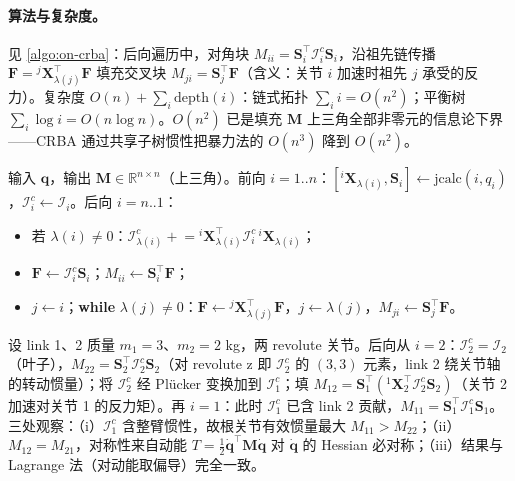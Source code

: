 \paragraph{算法与复杂度。}
见 \cref{algo:on-crba}：后向遍历中，对角块 $M_{ii}=\mathbf S_i^\top\mathcal I_i^c\mathbf S_i$，沿祖先链传播 $\mathbf F={}^j\mathbf X_{\lambda(j)}^\top\mathbf F$ 填充交叉块 $M_{ji}=\mathbf S_j^\top\mathbf F$（含义：关节 $i$ 加速时祖先 $j$ 承受的反力）。复杂度 $O(n)+\sum_i\mathrm{depth}(i)$：链式拓扑 $\sum_i i=O(n^2)$；平衡树 $\sum_i\log i=O(n\log n)$。$O(n^2)$ 已是填充 $\mathbf M$ 上三角全部非零元的信息论下界——CRBA 通过共享子树惯性把暴力法的 $O(n^3)$ 降到 $O(n^2)$。

\begin{algo}\label{algo:on-crba}
输入 $\mathbf q$，输出 $\mathbf M\in\mathbb R^{n\times n}$（上三角）。前向 $i=1..n$：$[{}^i\mathbf X_{\lambda(i)},\mathbf S_i]\!\leftarrow\!\mathrm{jcalc}(i,q_i)$，$\mathcal I_i^c\!\leftarrow\!\mathcal I_i$。后向 $i=n..1$：
\begin{itemize}
  \item 若 $\lambda(i)\neq0$：$\mathcal I_{\lambda(i)}^c\mathrel{+}={}^i\mathbf X_{\lambda(i)}^\top\mathcal I_i^c\,{}^i\mathbf X_{\lambda(i)}$；
  \item $\mathbf F\!\leftarrow\!\mathcal I_i^c\mathbf S_i$；$M_{ii}\!\leftarrow\!\mathbf S_i^\top\mathbf F$；
  \item $j\!\leftarrow\!i$；\textbf{while} $\lambda(j)\neq0$：$\mathbf F\!\leftarrow\!{}^j\mathbf X_{\lambda(j)}^\top\mathbf F$，$j\!\leftarrow\!\lambda(j)$，$M_{ji}\!\leftarrow\!\mathbf S_j^\top\mathbf F$。
\end{itemize}
\end{algo}

\begin{example}\label{ex:on-crba-2link}
设 link 1、2 质量 $m_1=3$、$m_2=2$ kg，两 revolute 关节。后向从 $i=2$：$\mathcal I_2^c=\mathcal I_2$（叶子），$M_{22}=\mathbf S_2^\top\mathcal I_2^c\mathbf S_2$（对 revolute z 即 $\mathcal I_2^c$ 的 $(3,3)$ 元素，link 2 绕关节轴的转动惯量）；将 $\mathcal I_2^c$ 经 Plücker 变换加到 $\mathcal I_1^c$；填 $M_{12}=\mathbf S_1^\top({}^1\mathbf X_2^\top\mathcal I_2^c\mathbf S_2)$（关节 2 加速对关节 1 的反力矩）。再 $i=1$：此时 $\mathcal I_1^c$ 已含 link 2 贡献，$M_{11}=\mathbf S_1^\top\mathcal I_1^c\mathbf S_1$。三处观察：（i）$\mathcal I_1^c$ 含整臂惯性，故根关节有效惯量最大 $M_{11}>M_{22}$；（ii）$M_{12}=M_{21}$，对称性来自动能 $T=\tfrac12\dot{\mathbf q}^\top\mathbf M\dot{\mathbf q}$ 对 $\dot{\mathbf q}$ 的 Hessian 必对称；（iii）结果与 Lagrange 法（对动能取偏导）完全一致。
\end{example}

